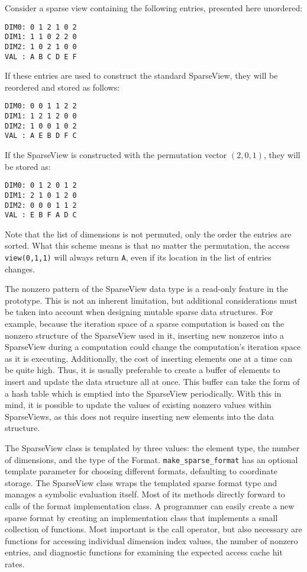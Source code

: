 Consider a sparse view containing the following entries, presented here unordered:
\begin{lstlisting}
DIM0: 0 1 2 1 0 2
DIM1: 1 1 0 2 2 0
DIM2: 1 0 2 1 0 0
VAL : A B C D E F 
\end{lstlisting}
If these entries are used to construct the standard SparseView, they will be reordered and stored as follows:
\begin{lstlisting}
DIM0: 0 0 1 1 2 2
DIM1: 1 2 1 2 0 0
DIM2: 1 0 0 1 0 2
VAL : A E B D F C
\end{lstlisting}
If the SparseView is constructed with the permutation vector $(2,0,1)$, they will be stored as:
\begin{lstlisting}
DIM0: 0 1 2 0 1 2
DIM1: 2 1 0 1 2 0
DIM2: 0 0 0 1 1 2
VAL : E B F A D C
\end{lstlisting}
Note that the list of dimensions is not permuted, only the order the entries are sorted. 
What this scheme means is that no matter the permutation, the access \verb.view(0,1,1). will always return \verb.A., even if its location in the list of entries changes.

The nonzero pattern of the SparseView data type is a read-only feature in the prototype.
This is not an inherent limitation, but additional considerations must be taken into account when designing mutable sparse data structures.
For example, because the iteration space of a sparse computation is based on the nonzero structure of the SparseView used in it, inserting new nonzeros into a SparseView during a computation could change the computation's iteration space as it is executing.
Additionally, the cost of inserting elements one at a time can be quite high. 
Thus, it is usually preferable to create a buffer of elements to insert and update the data structure all at once.
This buffer can take the form of a hash table which is emptied into the SparseView periodically.
With this in mind, it is possible to update the values of existing nonzero values within SparseViews, as this does not require inserting new elements into the data structure.

The SparseView class is templated by three values: the element type, the number of dimensions, and the type of the Format.
\verb.make_sparse_format. has an optional template parameter for choosing different formats, defaulting to coordinate storage.
The SparseView class wraps the templated sparse format type and manages a symbolic evaluation itself.
Most of its methods directly forward to calls of the format implementation class.
A programmer can easily create a new sparse format by creating an implementation class that implements a small collection of functions.
Most important is the call operator, but also necessary are functions for accessing individual dimension index values, the number of nonzero entries, and diagnostic functions for examining the expected access cache hit rates.

